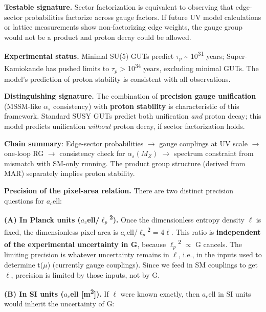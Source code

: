 \documentclass[11pt,a4paper]{article}
\theoremstyle{remark}
\begin{document}
\textbf{Testable signature.} Sector factorization is equivalent to observing that
edge-sector probabilities factorize across gauge factors. If future UV model
calculations or lattice measurements show non-factorizing edge weights, the
gauge group would not be a product and proton decay could be allowed.

\textbf{Experimental status.} Minimal SU(5) GUTs predict \(\ensuremath{\tau}_p\) \textasciitilde{} 10\textsuperscript{31}
years; Super-Kamiokande has pushed limits to \(\ensuremath{\tau}_p\) \textgreater{} 10\textsuperscript{34} years,
excluding minimal GUTs. The model's prediction of proton stability is
consistent with all observations.

\textbf{Distinguishing signature.} The combination of \textbf{precision gauge
unification} (MSSM-like \(\ensuremath{\alpha}_s\) consistency) with \textbf{proton stability}
is characteristic of this framework. Standard SUSY GUTs predict both
unification \emph{and} proton decay; this model predicts unification \emph{without}
proton decay, if sector factorization holds.

\textbf{Chain summary}: Edge-sector probabilities \ensuremath{\to} gauge couplings at UV scale
\ensuremath{\to} one-loop RG \ensuremath{\to} consistency check for \(\ensuremath{\alpha}_s(M_Z)\) \ensuremath{\to} spectrum
constraint from mismatch with SM-only running. The product group structure
(derived from MAR) separately implies proton stability.

\textbf{Precision of the pixel-area relation.} There are two distinct precision questions for \(a_c\)ell:

\textbf{(A) In Planck units (\(a_c\)ell/\(\ensuremath{\ell}_p\)\textsuperscript{2}).} Once the dimensionless entropy density \ensuremath{\ell} is fixed, the dimensionless pixel area is \(a_c\)ell/\(\ensuremath{\ell}_p\)\textsuperscript{2} = 4\ensuremath{\ell}. This ratio is \textbf{independent of the experimental uncertainty in G}, because \(\ensuremath{\ell}_p\)\textsuperscript{2} \ensuremath{\propto} G cancels. The limiting precision is whatever uncertainty remains in \ensuremath{\ell}, i.e., in the inputs used to determine t(\ensuremath{\mu}) (currently gauge couplings). Since we feed in SM couplings to get \ensuremath{\ell}, precision is limited by those inputs, not by G.

\textbf{(B) In SI units (\(a_c\)ell {[}m\textsuperscript{2}{]}).} If \ensuremath{\ell} were known exactly, then \(a_c\)ell in SI units would inherit the uncertainty of G:
\end{document}
